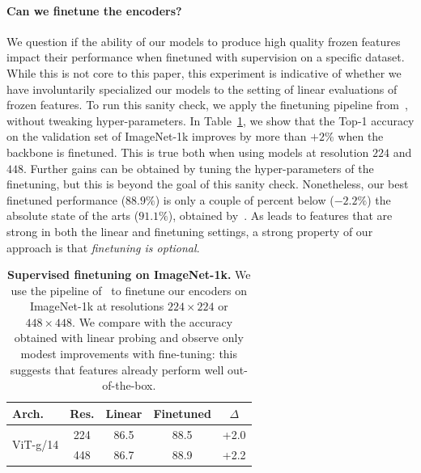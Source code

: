 \paragraph{Can we finetune the encoders?}
We question if the ability of our models to produce high quality frozen features impact their performance when finetuned with supervision on a specific dataset.
While this is not core to this paper, this experiment is indicative of whether we have involuntarily specialized our models to the setting of linear evaluations of frozen features.
To run this sanity check, we apply the finetuning pipeline from~\citet{touvron2022deit}, without tweaking hyper-parameters.
In Table~\ref{tab:ft-inet1k-alone}, we show that the Top-1 accuracy on the validation set of ImageNet-1k improves by more than $+2\%$ when the backbone is finetuned.
This is true both when using models at resolution $224$ and $448$.
Further gains can be obtained by tuning the hyper-parameters of the finetuning, but this is beyond the goal of this sanity check.
Nonetheless, our best finetuned performance ($88.9\%$) is only a couple of percent below ($-2.2\%$) the absolute state of the arts ($91.1\%$), obtained by~\citet{chen2023symbolic}.
As \OURS{} leads to features that are strong in both the linear and finetuning settings, a strong property of our approach is that \textit{finetuning is optional}.

\begin{table}[ht]
  \centering
  \begin{tabular}{@{}l cccc@{}}
    \toprule
     Arch. & Res. & Linear & Finetuned & $\Delta$ \\
    \midrule
     \multirow{2}{*}{ViT-g/14} & 224 & 86.5 & 88.5 & +2.0 \\
              & 448 & 86.7 & 88.9 & +2.2 \\
    \bottomrule
  \end{tabular}
  \caption{
    \textbf{Supervised finetuning on ImageNet-1k.}
    We use the pipeline of~\cite{touvron2022deit} to finetune our encoders on ImageNet-1k at resolutions $224\times224$ or $448\times448$. We compare with the accuracy obtained with linear probing and observe only modest improvements with fine-tuning: this suggests that \OURS{} features already perform well out-of-the-box.
  }
  \label{tab:ft-inet1k-alone}
\end{table}


